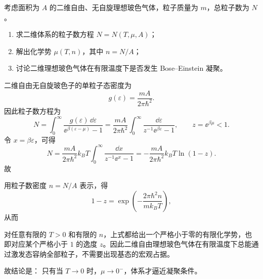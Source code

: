\begin{question}
考虑面积为 $A$ 的二维自由、无自旋理想玻色气体，粒子质量为 $m$，总粒子数为 $N$。

\begin{enumerate}[label=(\arabic*),leftmargin=2.5em]
  \item 求二维体系的粒子数方程 $N=N(T,\mu,A)$；
  \item 解出化学势 $\mu(T,n)$，其中 $n=N/A$；
  \item 讨论二维理想玻色气体在有限温度下是否发生 Bose--Einstein 凝聚。
\end{enumerate}

\begin{solution}
二维自由无自旋玻色子的单粒子态密度为
\[
g(\varepsilon)=\frac{mA}{2\pi\hbar^2}.
\]
因此粒子数方程为
\[
N=\int_0^\infty \frac{g(\varepsilon)\,\dd{\varepsilon}}{\ee^{\beta(\varepsilon-\mu)}-1}
=\frac{mA}{2\pi\hbar^2}\int_0^\infty \frac{\dd{\varepsilon}}{z^{-1}\ee^{\beta\varepsilon}-1},
\qquad z=\ee^{\beta\mu}<1.
\]
令 $x=\beta\varepsilon$，可得
\[
N=\frac{mA}{2\pi\hbar^2}k_B T\int_0^\infty \frac{\dd{x}}{z^{-1}\ee^x-1}
= -\frac{mA}{2\pi\hbar^2}k_B T\ln(1-z).
\]
故

用粒子数密度 $n=N/A$ 表示，得
\[
1-z=\exp\left(-\frac{2\pi\hbar^2 n}{m k_B T}\right),
\]
从而

对任意有限的 $T>0$ 和有限的 $n$，上式都给出一个严格小于零的有限化学势，也即对应某个严格小于 $1$ 的逸度 $z$。因此二维自由理想玻色气体在有限温度下总能通过激发态容纳全部粒子，不需要出现基态的宏观占据。

故结论是：
只有当 $T\to 0$ 时，$\mu\to 0^{-}$，体系才逼近凝聚条件。
\end{solution}
\end{question}

